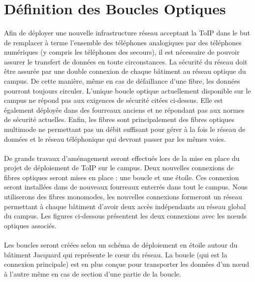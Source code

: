 \section{Définition des Boucles Optiques}

\paragraph{} Afin de déployer une nouvelle infrastructure réseau acceptant la ToIP dans le but de remplacer à terme l'ensemble des téléphones analogiques par des téléphones numériques (y compris les téléphones des secours), il est nécessaire de pouvoir assurer le transfert de données en toute circonstances. La sécurité du réseau doit être assurée par une double connexion de chaque bâtiment au réseau optique du campus. De cette manière, même en cas de défaillance d'une fibre, les données pourront toujours circuler. L'unique boucle optique actuellement disponible sur le campus ne répond pas aux exigences de sécurité citées ci-dessus. Elle est également déployée dans des fourreaux anciens et ne répondant pas aux normes de sécurité actuelles. Enfin, les fibres sont principalement des fibres optiques multimode ne permettant pas un débit suffisant pour gérer à la fois le réseau de données et le réseau téléphonique qui devront passer par les mêmes voies.

\paragraph{} De grands travaux d'aménagement seront effectués lors de la mise en place du projet de déploiement de ToIP sur le campus. Deux nouvelles connexions de fibres optiques seront mises en place : une boucle et une étoile. Ces connexion seront installées dans de nouveaux fourreaux enterrés dans tout le campus. Nous utiliserons des fibres monomodes, les nouvelles connexions formeront un réseau permettant à chaque bâtiment d'avoir deux accès indépendants au réseau global du campus. Les figures ci-dessous présentent les deux connexions avec les nœuds optiques associés.

\paragraph{} Les boucles seront créées selon un schéma de déploiement en étoile autour du bâtiment Jacquard qui représente le cœur du réseau. La boucle (qui est la connexion principale) est en plus conçue pour transporter les données d'un nœud à l'autre même en cas de section d'une partie de la boucle.


